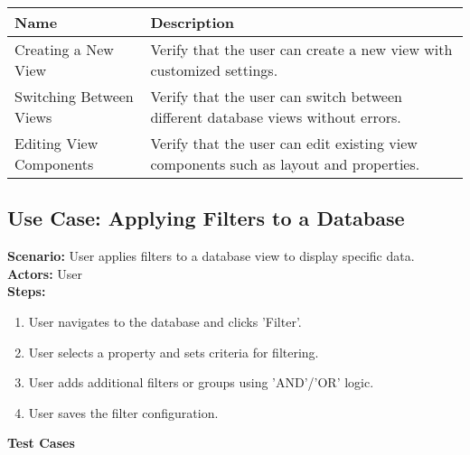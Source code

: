 \documentclass{article}
\begin{document}
            \begin{longtable}{|p{}|p{}|}
            \hline
            \textbf{Name} & \textbf{Description} \\
            \hline
            Creating a New View & Verify that the user can create a new view with customized settings. \\
\hline
Switching Between Views & Verify that the user can switch between different database views without errors. \\
\hline
Editing View Components & Verify that the user can edit existing view components such as layout and properties. \\
\hline
\end{longtable}\subsection{\textbf{Use Case: Applying Filters to a Database}}
\textbf{Scenario:} User applies filters to a database view to display specific data.\\
\textbf{Actors:} User\\
\textbf{Steps:}
\begin{enumerate}
\item User navigates to the database and clicks 'Filter'.
\item User selects a property and sets criteria for filtering.
\item User adds additional filters or groups using 'AND'/'OR' logic.
\item User saves the filter configuration.
\end{enumerate}
\textbf{Test Cases}
\end{document}
